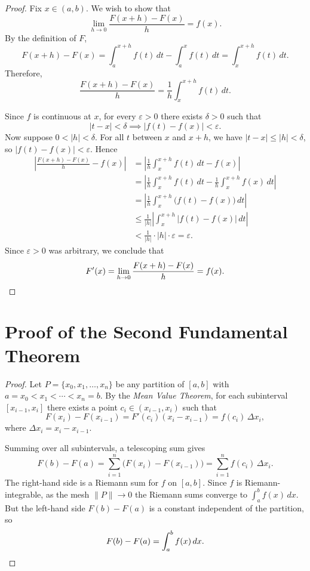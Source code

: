 \documentclass[11pt,a4paper]{article}
\begin{document}
\begin{proof}
Fix $x\in(a,b)$. We wish to show that
\[
    \lim_{h\to 0} \frac{F(x+h)-F(x)}{h} = f(x).
\]
By the definition of $F$,
\[
    F(x+h)-F(x) = \int_a^{x+h} f(t)\,dt - \int_a^x f(t)\,dt = \int_x^{x+h} f(t)\,dt.
\]
Therefore,
\[
    \frac{F(x+h)-F(x)}{h} = \frac{1}{h}\int_x^{x+h} f(t)\,dt.
\]

Since $f$ is continuous at $x$, for every $\varepsilon>0$ there exists $\delta>0$ such that
\[
    |t-x|<\delta \implies |f(t)-f(x)|<\varepsilon.
\]
Now suppose $0<|h|<\delta$. For all $t$ between $x$ and $x+h$, we have $|t-x|\le|h|<\delta$, so $|f(t)-f(x)|<\varepsilon$. Hence
\begin{align*}
    \left|\frac{F(x+h)-F(x)}{h} - f(x)\right|
    &= \left|\frac{1}{h}\int_x^{x+h} f(t)\,dt - f(x)\right| \\[6pt]
    &= \left|\frac{1}{h}\int_x^{x+h} f(t)\,dt - \frac{1}{h}\int_x^{x+h} f(x)\,dt\right| \\[6pt]
    &= \left|\frac{1}{h}\int_x^{x+h} \bigl(f(t)-f(x)\bigr)\,dt\right| \\[6pt]
    &\le \frac{1}{|h|}\left|\int_x^{x+h} |f(t)-f(x)|\,dt\right| \\[6pt]
    &< \frac{1}{|h|}\cdot |h|\cdot\varepsilon = \varepsilon.
\end{align*}
Since $\varepsilon>0$ was arbitrary, we conclude that
\[
    F'(x) = \lim_{h\to 0}\frac{F(x+h)-F(x)}{h} = f(x). \qedhere
\]
\end{proof}

\section{Proof of the Second Fundamental Theorem}

\begin{proof}
Let $P = \{x_0, x_1, \ldots, x_n\}$ be any partition of $[a,b]$ with $a=x_0 < x_1 < \cdots < x_n = b$. By the \emph{Mean Value Theorem}, for each subinterval $[x_{i-1},x_i]$ there exists a point $c_i\in(x_{i-1},x_i)$ such that
\[
    F(x_i)-F(x_{i-1}) = F'(c_i)(x_i - x_{i-1}) = f(c_i)\,\Delta x_i,
\]
where $\Delta x_i = x_i - x_{i-1}$.

Summing over all subintervals, a telescoping sum gives
\[
    F(b)-F(a) = \sum_{i=1}^n \bigl(F(x_i)-F(x_{i-1})\bigr) = \sum_{i=1}^n f(c_i)\,\Delta x_i.
\]
The right-hand side is a Riemann sum for $f$ on $[a,b]$. Since $f$ is Riemann-integrable, as the mesh $\|P\|\to 0$ the Riemann sums converge to $\int_a^b f(x)\,dx$. But the left-hand side $F(b)-F(a)$ is a constant independent of the partition, so
\[
    F(b)-F(a) = \int_a^b f(x)\,dx. \qedhere
\]
\end{proof}
\end{document}
